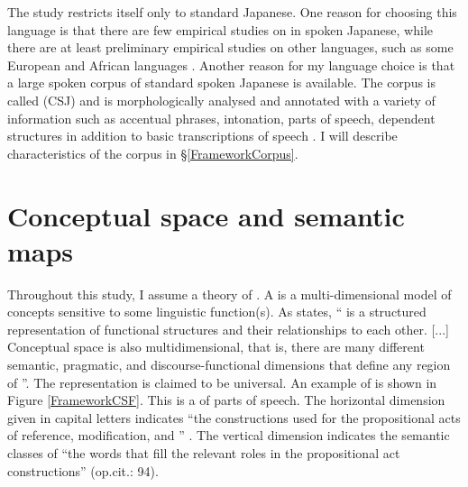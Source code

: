 The study restricts itself only to standard Japanese. One reason for choosing this language is that there are few empirical studies on  in spoken Japanese,
while there are at least preliminary empirical studies on other languages, such as some European and African languages \cite[e.g.,][]{cowles03,dipperetal04,dipperetal07,ritzetal08,skopeteasetal06,cookfildhauer11,chiarcosetal11}.
Another reason for my language choice is that a large spoken corpus of standard spoken Japanese is available.
The corpus is called  (CSJ) and 
is morphologically analysed and annotated with a variety of information such as accentual phrases, intonation, parts of speech, dependent structures in addition to basic transcriptions of speech \cite{maekawa03,maekawaetal04}.
I will describe characteristics of the corpus in \S \ref{FrameworkCorpus}.


\section{Conceptual space and semantic maps}\label{FrameworkSemanticMap}

Throughout this study,
I assume a theory of  \cite{croft01,haspelmath03}.
A  is a multi-dimensional model of concepts sensitive to some linguistic function(s).
As  states,
`` is a structured representation of functional structures and their relationships to each other. [...] Conceptual space is also multidimensional, that is, there are many different semantic, pragmatic, and discourse-functional dimensions that define any region of ''.
The representation is claimed to be universal.
An example of  is shown in Figure \ref{FrameworkCSF}.
This is a  of parts of speech.
The horizontal dimension given in capital letters indicates
``the constructions used for the propositional acts of reference, modification, and '' \cite[][p.\ 93]{croft01}.
The vertical dimension indicates the semantic classes of ``the words that fill the relevant roles in the propositional act constructions''  (op.cit.: 94).

